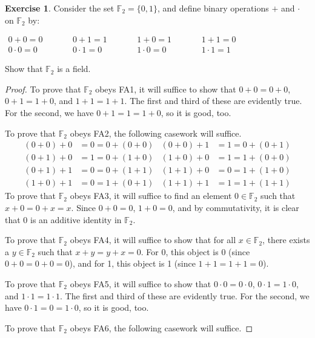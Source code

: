 \documentclass[11pt]{article}
\newcommand{\bbF}{\mathbb{F}}
\theoremstyle{definition}
\newtheorem{exercise}[theorem]{Exercise}
\numberwithin{equation}{subsection}
\begin{document}
\begin{exercise}
	Consider the set $\bbF_{2} = \{0, 1\}$, and define binary operations $+$ and $\cdot$ on $\bbF_{2}$ by:
	\begin{center}
	$
	\begin{array}{ccccccc}
		0 + 0 = 0 & \phantom{MM} & 0 + 1 = 1 & \phantom{MM} & 1 + 0 = 1 & \phantom{MM} &1 + 1 = 0 \\
		0 \cdot 0 = 0 & \phantom{MM} & 0 \cdot 1 = 0 & \phantom{MM}  & 1\cdot 0 =0 & \phantom{MM} &1 \cdot 1 = 1 
	\end{array}
	$
	\end{center}
	
	Show that $\bbF_{2}$ is a field.  


\begin{proof}
        To prove that $\bbF_2$ obeys FA1, it will suffice to show that $0+0=0+0$, $0+1=1+0$, and $1+1=1+1$. The first and third of these are evidently true. For the second, we have $0+1=1=1+0$, so it is good, too.\par
        To prove that $\bbF_2$ obeys FA2, the following casework will suffice.
        \begin{align*}
            (0+0)+0 &= 0 = 0+(0+0)&
            (0+0)+1 &= 1 = 0+(0+1)\\
            (0+1)+0 &= 1 = 0+(1+0)&
            (1+0)+0 &= 1 = 1+(0+0)\\
            (0+1)+1 &= 0 = 0+(1+1)&
            (1+1)+0 &= 0 = 1+(1+0)\\
            (1+0)+1 &= 0 = 1+(0+1)&
            (1+1)+1 &= 1 = 1+(1+1)
        \end{align*}
        To prove that $\bbF_2$ obeys FA3, it will suffice to find an element $0\in\bbF_2$ such that $x+0=0+x=x$. Since $0+0=0$, $1+0=0$, and by commutativity, it is clear that 0 is an additive identity in $\bbF_2$.\par
        To prove that $\bbF_2$ obeys FA4, it will suffice to show that for all $x\in\bbF_2$, there exists a $y\in\bbF_2$ such that $x+y=y+x=0$. For 0, this object is 0 (since $0+0=0+0=0$), and for 1, this object is 1 (since $1+1=1+1=0$).\par
        To prove that $\bbF_2$ obeys FA5, it will suffice to show that $0\cdot 0=0\cdot 0$, $0\cdot 1=1\cdot 0$, and $1\cdot 1=1\cdot 1$. The first and third of these are evidently true. For the second, we have $0\cdot 1=0=1\cdot 0$, so it is good, too.\par
        To prove that $\bbF_2$ obeys FA6, the following casework will suffice.

\end{proof}
\end{exercise}
\end{document}
